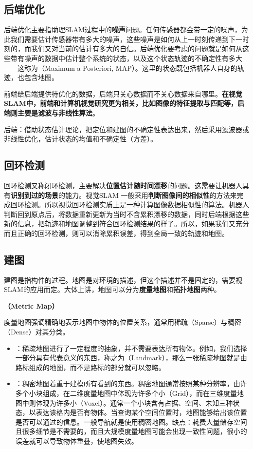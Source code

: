 \subsection{后端优化}
后端优化主要指助理SLAM过程中的\textbf{噪声}问题。任何传感器都会带一定的噪声，为此我们需要估计传感器带有多大的噪声，这些噪声是如何从上一时刻传递到下一时刻的，而我们又对当前的估计有多大的自信。后端优化要考虑的问题就是如何从这些带有噪声的数据中估计整个系统的状态，以及这个状态轨迹的不确定性有多大——这称为（Maximum-a-Posteriori, MAP）。这里的状态既包括机器人自身的轨迹，也包含地图。

前端给后端提供待优化的数据，后端只关心数据而不关心数据来自哪里。\textbf{在视觉SLAM中，前端和计算机视觉研究更为相关，比如图像的特征提取与匹配等，后端则主要是滤波与非线性算法}。

后端：借助状态估计理论，把定位和建图的不确定性表达出来，然后采用滤波器或非线性优化，估计状态的均值和不确定性（方差）。

\subsection{回环检测}
回环检测又称闭环检测，主要解决\textbf{位置估计随时间漂移}的问题。这需要让机器人具有\textbf{识别到过的场景}的能力。视觉SLAM 一般采用\textbf{判断图像间的相似性}的方法来完成回环检测。所以视觉回环检测实质上是一种计算图像数据相似性的算法。机器人判断回到原点后，将数据重新更新为当时不含累积漂移的数据，同时后端根据这些新的信息，把轨迹和地图调整到符合回环检测结果的样子。所以，如果我们又充分而且正确的回环检测，则可以消除累积误差，得到全局一致的轨迹和地图。

\subsection{建图}
建图是指构件的过程。地图是对环境的描述，但这个描述并不是固定的，需要视SLAM的应用而定。大体上讲，地图可以分为\textbf{度量地图}和\textbf{拓扑地图}两种。

\nob[1] \textbf{（Metric Map）}

度量地图强调精确地表示地图中物体的位置关系，通常用稀疏（Sparse）与稠密（Dense）对其分类。
\begin{itemize}[itemsep=0.1pt,topsep =2pt]
    \item {}：稀疏地图进行了一定程度的抽象，并不需要表达所有物体。例如，我们选择一部分具有代表意义的东西，称之为（Landmark），那么一张稀疏地图就是由路标组成的地图，而不是路标的部分就可以忽略。
    \item {}：稠密地图着重于建模所有看到的东西。稠密地图通常按照某种分辨率，由许多个小块组成，在二维度量地图中体现为许多个小（Grid），而在三维度量地图中则体现为许多小（Voxel）。通常一个小块含有占据、空间、未知三种状态，以表达该格内是否有物体。当查询某个空间位置时，地图能够给出该位置是否可以通过的信息。一般导航就是使用稠密地图。缺点：耗费大量储存空间且很多细节是不需要的，而且大规模度量地图可能会出现一致性问题，很小的误差就可以导致物体重叠，使地图失效。
\end{itemize}
\vspace*{1em}

